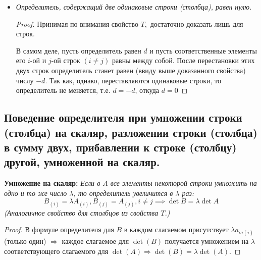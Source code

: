 \documentclass[a4paper, 12pt]{article}
\begin{document}
\begin{itemize}
\begin{proof}
\[\begin{pmatrix}
1 & 2 & \ldots & i & \ldots & j & \ldots & n\\
\alpha_1 & \alpha_2 & \ldots & \alpha_j & \ldots & \alpha_i & \ldots  & \alpha_n
\end{pmatrix} \; (4)
\]
так как, например, элемент $a_{i\alpha_i}$ стоит теперь в $j$-ой строке, но остается в старом $\alpha_i$-ом столбце. Подстановка (4) получается, однако, из подстановки (3) путем одной транспозиции в нижней строчке, т.е. имеет противоположную четность. Отсюда следует, что все члены определителя (1) входят в определитель (2) с обратными знаками, т.е. определители (1) и (2) отличаются лишь знаком.
\end{proof}
\item \textit{Определитель, содержащий две одинаковые строки (столбца), равен нулю.}
\begin{proof}
Принимая по внимания свойство $T$,\ достаточно доказать лишь для строк.

В самом деле, пусть определитель равен $d$ и пусть соответственные элементы его $i$-ой и $j$-ой строк $(i \neq j)$ равны между собой. После перестановки этих двух строк определитель станет равен (ввиду выше доказанного свойства) числу $-d$. Так как, однако, переставляются одинаковые строки, то определитель не меняется, т.е. $d = -d$, откуда $d = 0$ 
\end{proof}
\end{itemize}

\subsection{Поведение определителя при умножении строки (столбца) на скаляр, разложении строки (столбца) в сумму двух, прибавлении к строке (столбцу) другой, умноженной на скаляр.}

\textbf{Умножение на скаляр:} \textit{Если в $A$ \textit{все элементы некоторой строки умножить на одно и то же число} $\lambda$, то определитель увеличится в $\lambda$ раз: \[B_{(i)} = \lambda A_{(i)}, B_{(j)} = A_{(j)}, i \neq j \implies \det{B} = \lambda\det{A}\] (Аналогичное свойство для столбцов из свойства $T$.)}
\begin{proof}
В формуле определителя для $B$ в каждом слагаемом присутствует $\lambda a_{i \sigma(i)}$ (только один) $\Rightarrow$ каждое слагаемое для $\det(B)$ получается умножением на $\lambda$ соответствующего слагаемого для $\det(A) \Rightarrow \det(B) = \lambda \det(A)$.
\end{proof}
\end{document}
